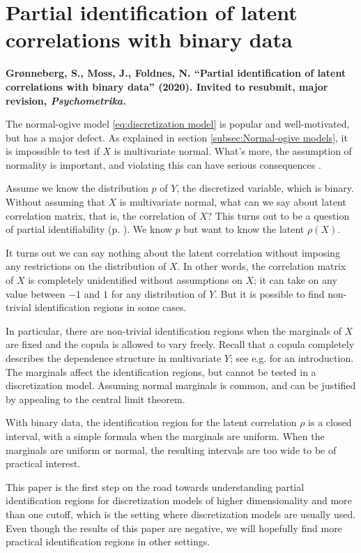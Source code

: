 \section{Partial identification of
latent correlations with binary data}
\textbf{Grønneberg, S., Moss, J., Foldnes, N. ``Partial identification of
latent correlations with binary data'' (2020). Invited to resubmit, major revision, \emph{Psychometrika.}}

The normal-ogive model \eqref{eq:discretization model} is popular and well-motivated, but has a major defect. As explained in section \ref{subsec:Normal-ogive models}, it is impossible to test if $X$ is multivariate normal. What's more, the assumption of normality is important, and violating this can have serious consequences \parencite{Foldnes2019-ew}. 

Assume we know the distribution $p$ of $Y$, the discretized variable, which is binary. Without assuming that $X$ is multivariate normal, what can we say about latent correlation matrix, that is, the correlation of $X$? This turns out to be a question of partial identifiability (p. \pageref{sec:partial identification}). We know $p$ but want to know the latent $\rho(X)$.

It turns out we can say nothing about the latent correlation without imposing any restrictions on the distribution of $X$. In other words, the correlation matrix of $X$ is completely unidentified without assumptions on $X$; it can take on any value between $-1$ and $1$ for any distribution of $Y$. But it is possible to find non-trivial identification regions in some cases.

In particular, there are non-trivial identification regions when the marginals of $X$ are fixed and the copula is allowed to vary freely. Recall that a copula completely describes the dependence structure in multivariate $Y$; see e.g. \textcite{Nelsen2007-qj} for an introduction. The marginals affect the identification regions, but cannot be tested in a discretization model. Assuming normal marginals is common, and can be justified by appealing to the central limit theorem.

With binary data, the identification region for the latent correlation $\rho$ is a closed interval, with a simple formula when the marginals are uniform. When the marginals are uniform or normal, the resulting intervals are too wide to be of practical interest. 

This paper is the first step on the road towards understanding partial identification regions for discretization models of higher dimensionality and more than one cutoff, which is the setting where discretization models are usually used. Even though the results of this paper are negative, we will hopefully find more practical identification regions in other settings.

